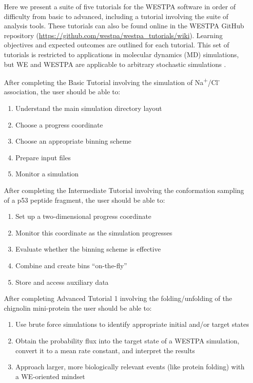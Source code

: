 \documentclass[9pt,tutorial,pubversion]{livecoms}
\begin{document}
Here we present a suite of five tutorials for the WESTPA software in order of difficulty from basic to advanced, including a tutorial involving the suite of analysis tools. These tutorials can also be found online in the WESTPA GitHub repository (\url{https://github.com/westpa/westpa_tutorials/wiki}).
Learning objectives and expected outcomes are outlined for each tutorial. 
This set of tutorials is restricted to applications in molecular dynamics (MD) simulations, but WE and WESTPA are applicable to arbitrary stochastic simulations \citep{Donovan2013,Donovan2016,Read2018}.

After completing the Basic Tutorial involving the simulation of Na\textsuperscript{+}/Cl\textsuperscript{-} association, the user should be able to: 
\begin{enumerate}
\item Understand the main simulation directory layout
\item Choose a progress coordinate
\item Choose an appropriate binning scheme
\item Prepare input files
\item Monitor a simulation
\end{enumerate}

After completing the Intermediate Tutorial involving the conformation sampling of a p53 peptide fragment, the user should be able to:
\begin{enumerate}
\item Set up a two-dimensional progress coordinate
\item Monitor this coordinate as the simulation progresses
\item Evaluate whether the binning scheme is effective
\item Combine and create bins “on-the-fly”
\item Store and access auxiliary data
\end{enumerate}

After completing Advanced Tutorial 1 involving the folding/unfolding of the chignolin mini-protein the user should be able to:
\begin{enumerate}
\item Use brute force simulations to identify appropriate initial and/or target states
\item Obtain the probability flux into the target state of a WESTPA simulation, convert it to a mean rate constant, and interpret the results
\item Approach larger, more biologically relevant events (like protein folding) with a WE-oriented mindset
\end{enumerate}
\end{document}
